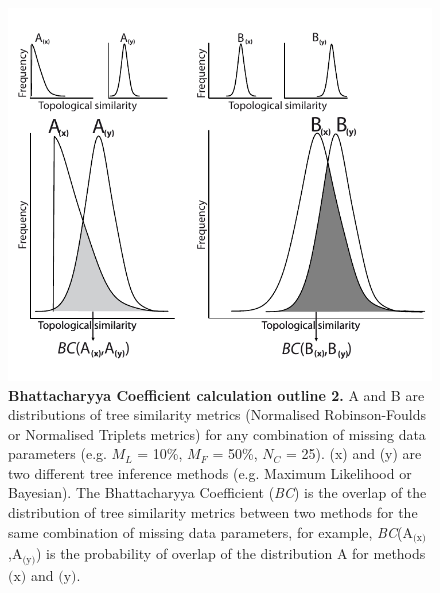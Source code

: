 \begin{figure}[!h] %
\centering
    \includegraphics[width=1\textwidth]{TEM/Figures/Fig3.pdf}
\caption[Bhattacharyya Coefficient calculation outline 2]{\textbf{Bhattacharyya Coefficient calculation outline 2.} A and B are distributions of tree similarity metrics (Normalised Robinson-Foulds or Normalised Triplets metrics) for any combination of missing data parameters (e.g. $M_{L}$ = 10\%, $M_{F}$ = 50\%, $N_{C}$ = 25). (x) and (y) are two different tree inference methods (e.g. Maximum Likelihood or Bayesian). The Bhattacharyya Coefficient (\textit{BC}) is the overlap of the distribution of tree similarity metrics between two methods for the same combination of missing data parameters, for example, \textit{BC}(A$_{\text{(x)}}$,A$_{\text{(y)}}$) is the probability of overlap of the distribution A for methods $\text{(x)}$ and $\text{(y)}$.}
\label{Fig_Bhattacharyya_Coefficients2} 
\end{figure}

